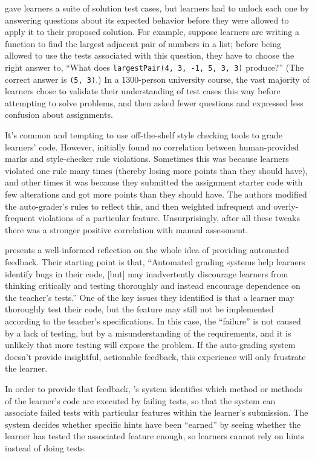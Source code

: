 \cite{Basu2015} gave learners a suite of solution test cases, but
learners had to unlock each one by answering questions about its
expected behavior before they were allowed to apply it to their
proposed solution.  For example, suppose learners are writing a
function to find the largest adjacent pair of numbers in a list;
before being allowed to use the tests associated with this question,
they have to choose the right answer to, ``What does
\texttt{largestPair(4, 3, -1, 5, 3, 3)} produce?''  (The correct
answer is \texttt{(5, 3)}.)  In a 1300-person university course, the
vast majority of learners chose to validate their understanding of
test cases this way before attempting to solve problems, and then
asked fewer questions and expressed less confusion about assignments.

It's common and tempting to use off-the-shelf style checking tools to
grade learners' code.  However, \cite{Nutb2016} initially found no
correlation between human-provided marks and style-checker rule
violations.  Sometimes this was because learners violated one rule
many times (thereby losing more points than they should have), and
other times it was because they submitted the assignment starter code
with few alterations and got more points than they should have.  The
authors modified the auto-grader's rules to reflect this, and then
weighted infrequent and overly-frequent violations of a particular
feature.  Unsurprisingly, after all these tweaks there was a stronger
positive correlation with manual assessment.

\cite{Buff2015} presents a well-informed reflection on the whole idea
of providing automated feedback.  Their starting point is that,
``Automated grading systems help learners identify bugs in their code,
{[}but{]} may inadvertently discourage learners from thinking
critically and testing thoroughly and instead encourage dependence on
the teacher's tests.''  One of the key issues they identified is that
a learner may thoroughly test their code, but the feature may still
not be implemented according to the teacher's specifications.  In this
case, the ``failure'' is not caused by a lack of testing, but by a
misunderstanding of the requirements, and it is unlikely that more
testing will expose the problem.  If the auto-grading system doesn't
provide insightful, actionable feedback, this experience will only
frustrate the learner.

In order to provide that feedback, \cite{Buff2015}'s system identifies
which method or methods of the learner's code are executed by failing
tests, so that the system can associate failed tests with particular
features within the learner's submission.  The system decides whether
specific hints have been ``earned'' by seeing whether the learner has
tested the associated feature enough, so learners cannot rely on hints
instead of doing tests.

